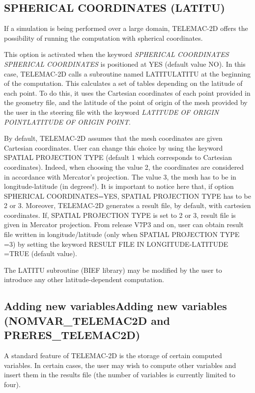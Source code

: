 \documentclass{article} %
\begin{document}
\subsection{ SPHERICAL COORDINATES (LATITU) }

 If a simulation is being performed over a large domain, TELEMAC-2D offers the possibility of running the computation with spherical coordinates.

 This option is activated when the keyword \textit{SPHERICAL COORDINATES} \textit{SPHERICAL COORDINATES} is positioned at YES (default value NO). In this case, TELEMAC-2D calls a subroutine named LATITULATITU at the beginning of the computation. This calculates a set of tables depending on the latitude of each point. To do this, it uses the Cartesian coordinates of each point provided in the geometry file, and the latitude of the point of origin of the mesh provided by the user in the steering file with the keyword \textit{LATITUDE OF ORIGIN POINTLATITUDE OF ORIGIN POINT}.

 By default, TELEMAC-2D assumes that the mesh coordinates are given Cartesian coordinates. User can change this choice by using the keyword SPATIAL PROJECTION TYPE (default 1 which corresponds to Cartesian coordinates). Indeed, when choosing the value 2, the coordinates are considered in accordance with Mercator's projection. The value 3, the mesh has to be in longitude-latitude (in degrees!). It is important to notice here that, if option SPHERICAL COORDINATES=YES, SPATIAL PROJECTION TYPE has to be 2 or 3.
\newline
Moreover, TELEMAC-2D generates a result file, by default, with cartesien coordinates. If, SPATIAL PROJECTION TYPE is set to 2 or 3, result file is given in Mercator projection. From release V7P3 and on, user can obtain result file written in longitude/latitude (only when SPATIAL PROJECTION TYPE =3) by setting the keyword RESULT FILE IN LONGITUDE-LATITUDE =TRUE (default value).   

 The LATITU subroutine (BIEF library) may be modified by the user to introduce any other latitude-dependent computation.

\subsection{ Adding new variablesAdding new variables (NOMVAR\_TELEMAC2D and PRERES\_TELEMAC2D)}

 A standard feature of TELEMAC-2D is the storage of certain computed variables. In certain cases, the user may wish to compute other variables and insert them in the results file (the number of variables is currently limited to four).
\end{document}
